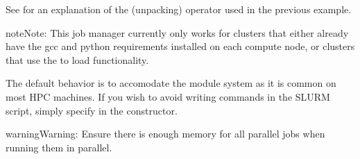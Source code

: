 \documentclass[letterpaper,10pt,english,openany,oneside]{sphinxmanual}
\begin{document}
\begin{sphinxVerbatim}[commandchars=\\\{\}]
     
       
           
         
\end{sphinxVerbatim}

\sphinxAtStartPar
See 
for an explanation of the \sphinxcode{\sphinxupquote{**}} (unpacking) operator used
in the previous example.

\begin{sphinxadmonition}{note}{Note:}
\sphinxAtStartPar
This job manager currently only works for clusters that either
already have the gcc and python requirements installed on each
compute node, or clusters that use the
 to load
functionality.

\sphinxAtStartPar
The default behavior is to accomodate the module system as it
is common on most HPC machines. If you wish to avoid writing
 commands in the SLURM script, simply specify
 in the  constructor.
\end{sphinxadmonition}

\begin{sphinxadmonition}{warning}{Warning:}
\sphinxAtStartPar
Ensure there is enough memory for all parallel jobs when running
them in parallel.
\end{sphinxadmonition}
\end{document}
